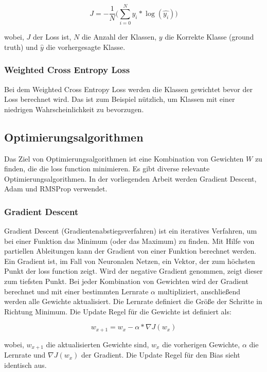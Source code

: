 \begin{equation}
  J = -\frac{1}{N} \Big(\sum_{i=0}^N y_{i} * \log(\hat{y_{i}})\Big)
\end{equation}

wobei, $J$ der Loss ist, $N$ die Anzahl der Klassen, $y$ die Korrekte Klasse (\gls{ground truth}) und $ \hat{y}$ die vorhergesagte Klasse.

\subsubsection{Weighted Cross Entropy Loss}
Bei dem Weighted Cross Entropy Loss werden die Klassen gewichtet bevor der Loss berechnet wird. Das ist zum Beispiel nützlich, um Klassen  
mit einer niedrigen Wahrscheinlichkeit zu bevorzugen.

\subsection{Optimierungsalgorithmen}
Das Ziel von Optimierungsalgorithmen ist eine Kombination von Gewichten $ W $ zu finden, die die \gls{loss function} minimieren.
Es gibt diverse relevante Optimierungsalgorithmen. In der vorliegenden Arbeit werden Gradient Descent, Adam und RMSProp verwendet.

\subsubsection{Gradient Descent}
Gradient Descent (Gradientenabstiegsverfahren) ist ein iteratives Verfahren, um bei einer Funktion das Minimum (oder das Maximum) zu finden. 
Mit Hilfe von partiellen Ableitungen kann der Gradient von einer Funktion berechnet werden. Ein Gradient ist, im Fall von Neuronalen
Netzen, ein Vektor, der zum höchsten Punkt der \gls{loss function} zeigt. Wird der negative Gradient genommen, zeigt dieser zum tiefsten Punkt.
Bei jeder Kombination von Gewichten wird der Gradient berechnet und mit einer bestimmten Lernrate $ \alpha $ multipliziert, anschließend werden 
alle Gewichte aktualisiert. Die Lernrate definiert die Größe der Schritte in Richtung Minimum. Die Update Regel für die Gewichte ist definiert als:

\begin{equation}
  w_{x+1} = w_x - \alpha * \nabla J(w_x)
\end{equation}

wobei, $w_{x+1}$ die aktualisierten Gewichte sind, $w_x$ die vorherigen Gewichte, $ \alpha $ die Lernrate und $\nabla J(w_x)$ der Gradient. 
Die Update Regel für den Bias sieht identisch aus.

